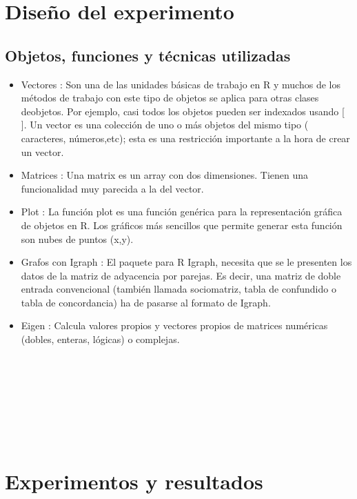 \documentclass[twocolumn]{article}
\begin{document}
\section{Diseño del experimento}
\subsection{Objetos, funciones y técnicas utilizadas}
\begin{itemize}
	\item
	Vectores : Son una de las unidades básicas de trabajo en R y muchos de los métodos de trabajo con este tipo de objetos se aplica para otras clases deobjetos. Por ejemplo, casi todos los objetos pueden ser indexados usando [ ].
	Un vector es una colección de uno o más objetos del mismo tipo (
caracteres, números,etc); esta es una restricción importante a la hora de crear un vector.
	\item
	Matrices : Una matrix es un array con dos dimensiones. Tienen una
funcionalidad muy parecida a la del vector.
	\item
    Plot  : La función plot es una función genérica para la representación gráfica de objetos en R. Los gráficos más sencillos que permite generar esta función son nubes de puntos (x,y).
    \item 
    Grafos con Igraph : El paquete para R Igraph, necesita que se le presenten los datos de la matriz de adyacencia por parejas. Es decir, una matriz de doble entrada convencional (también llamada sociomatriz, tabla de confundido o tabla de concordancia) ha de pasarse al formato de Igraph.
    \item
    Eigen : Calcula valores propios y vectores propios de matrices numéricas (dobles, enteras, lógicas) o complejas.\\ \\ \\ \\ \\ \\ \\ \\
	\end{itemize}	
\section{Experimentos y resultados}
\end{document}
